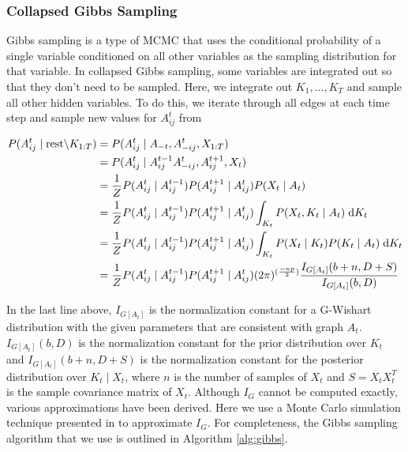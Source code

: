 \documentclass{article}
\begin{document}
\subsubsection{Collapsed Gibbs Sampling}

Gibbs sampling is a type of MCMC that uses the conditional probability of a single variable conditioned on all other variables as the sampling distribution for that variable. In collapsed Gibbs sampling, some variables are integrated out so that they don't need to be sampled. Here, we integrate out $K_1,...,K_T$ and sample all other hidden variables. To do this, we iterate through all edges at each time step and sample new values for $A_{ij}^t$ from 

\begin{align*}
P(A_{ij}^t \mid \text{rest} \backslash K_{1:T}) &= P(A_{ij}^t \mid A_{-t}, A_{-ij}^t, X_{1:T}) \\
&= P(A_{ij}^t \mid A_{ij}^{t-1} A_{-ij}^t, A_{ij}^{t+1}, X_t) \\
&= \frac{1}{Z} P(A_{ij}^t \mid A_{ij}^{t-1}) P(A_{ij}^{t+1} \mid A_{ij}^t) P(X_t \mid A_t) \\
&= \frac{1}{Z} P(A_{ij}^t \mid A_{ij}^{t-1}) P(A_{ij}^{t+1} \mid A_{ij}^t) \int_{K_t} P(X_t, K_t \mid A_t) \hspace{0.1cm} \mathrm{d} K_t \\
&= \frac{1}{Z} P(A_{ij}^t \mid A_{ij}^{t-1}) P(A_{ij}^{t+1} \mid A_{ij}^t) \int_{K_t} P(X_t \mid K_t) P(K_t \mid A_t) \hspace{0.1cm} \mathrm{d} K_t \\
&= \frac{1}{Z} P(A_{ij}^t \mid A_{ij}^{t-1}) P(A_{ij}^{t+1} \mid A_{ij}^t) (2\pi)^{(\frac{-np}{2})} \frac{I_{G[A_t]}(b+n, D+S)}{I_{G[A_t]}(b, D)}
\end{align*}

In the last line above, $I_{G[A_t]}$ is the normalization constant for a G-Wishart distribution with the given parameters that are consistent with graph $A_t$. $I_{G[A_t]}(b,D)$ is the normalization constant for the prior distribution over $K_t$ and $I_{G[A_t]}(b+n,D+S)$ is the normalization constant for the posterior distribution over $K_t \mid X_t$, where $n$ is the number of samples of $X_t$ and $S = X_t X_t^T$ is the sample covariance matrix of $X_t$. Although $I_G$ cannot be computed exactly, various approximations have been derived. Here we use a Monte Carlo simulation technique presented in \cite{ataykayismassam} to approximate $I_G$. For completeness, the Gibbs sampling algorithm that we use is outlined in Algorithm \ref{alg:gibbs}.
\end{document}
